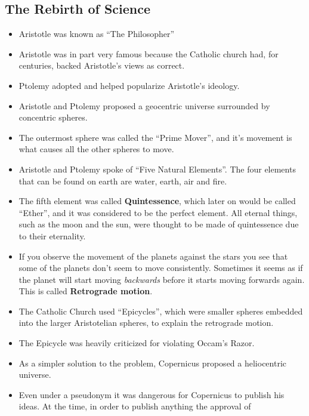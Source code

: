 \documentclass{article}
\begin{document}
\begin{spacing}{1.2}
    \subsection{The Rebirth of Science}
    \begin{itemize}
        \item Aristotle was known as ``The Philosopher''
        \item Aristotle was in part very famous because the Catholic church
            had, for centuries, backed Aristotle's views as correct.
        \item Ptolemy adopted and helped popularize Aristotle's ideology.
        \item Aristotle and Ptolemy proposed a geocentric universe surrounded by
            concentric spheres.
        \item The outermost sphere was called the ``Prime Mover'', and it's
            movement is what causes all the other spheres to move.
        \item Aristotle and Ptolemy spoke of ``Five Natural Elements''. The four
            elements that can be found on earth are water, earth, air and fire.
        \item The fifth element was called \textbf{Quintessence}, which later on
            would be called ``Ether'', and it was considered to be the perfect
            element. All eternal things, such as the moon and the sun, were
            thought to be made of quintessence due to their eternality.
        \item If you observe the movement of the planets against the stars you
            see that some of the planets don't seem to move consistently.
            Sometimes it seems as if the planet will start moving
            \textit{backwards} before it starts moving forwards again. This is
            called \textbf{Retrograde motion}.
        \item The Catholic Church used ``Epicycles'', which were smaller spheres
            embedded into the larger Aristotelian spheres, to explain the
            retrograde motion.
        \item The Epicycle was heavily criticized for violating Occam's Razor.
        \item As a simpler solution to the problem, Copernicus proposed a
            heliocentric universe.
        \item Even under a pseudonym it was dangerous for Copernicus to publish
            his ideas. At the time, in order to publish anything the approval of

\end{itemize}
\end{spacing}
\end{document}
